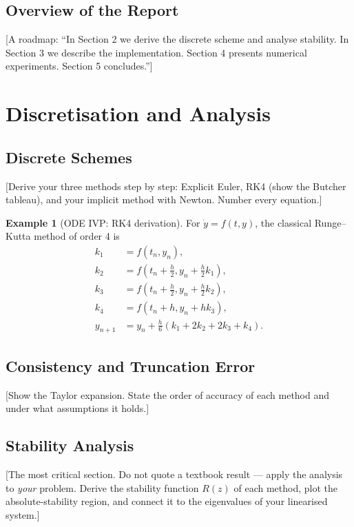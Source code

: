 \documentclass[11pt,a4paper]{article}
\theoremstyle{definition}
\newtheorem{example}[theorem]{Example}
\theoremstyle{remark}
\begin{document}
\subsection{Overview of the Report}
[A roadmap: ``In Section 2 we derive the discrete scheme and analyse stability.
In Section 3 we describe the implementation. Section 4 presents numerical
experiments. Section 5 concludes.'']

\newpage
\section{Discretisation and Analysis}

\subsection{Discrete Schemes}
[Derive your three methods step by step: Explicit Euler, RK4 (show the Butcher
tableau), and your implicit method with Newton. Number every equation.]

\begin{example}[ODE IVP: RK4 derivation]
For $\dot{y} = f(t,y)$, the classical Runge--Kutta method of order 4 is
\begin{align}
    k_1 &= f(t_n, y_n), \\
    k_2 &= f\!\left(t_n + \frac{h}{2}, y_n + \frac{h}{2}k_1\right), \\
    k_3 &= f\!\left(t_n + \frac{h}{2}, y_n + \frac{h}{2}k_2\right), \\
    k_4 &= f(t_n + h, y_n + hk_3), \\
    y_{n+1} &= y_n + \frac{h}{6}(k_1 + 2k_2 + 2k_3 + k_4).
\end{align}
\end{example}

\subsection{Consistency and Truncation Error}
[Show the Taylor expansion. State the order of accuracy of each method and under
what assumptions it holds.]

\subsection{Stability Analysis}
[The most critical section. Do not quote a textbook result --- apply the analysis
to \emph{your} problem. Derive the stability function $R(z)$ of each method, plot
the absolute-stability region, and connect it to the eigenvalues of your
linearised system.]
\end{document}
